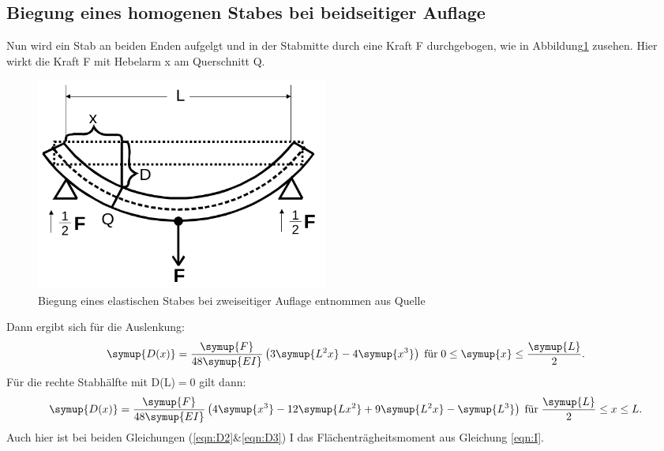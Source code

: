 \subsection{Biegung eines homogenen Stabes bei beidseitiger Auflage}
\label{sec:T2}
Nun wird ein Stab an beiden Enden aufgelgt und in der Stabmitte
durch eine Kraft F durchgebogen, wie in Abbildung\ref{fig:abb5} zusehen. Hier
wirkt die Kraft F mit Hebelarm x am Querschnitt Q.
\begin{figure}
  \centering
  \includegraphics[height= 7cm]{logos/Abb5.png}
  \caption{Biegung eines elastischen Stabes bei zweiseitiger Auflage
  entnommen aus Quelle \cite{sample} }
  \label{fig:abb5}
\end{figure}
\FloatBarrier
Dann ergibt sich für die Auslenkung:
\begin{equation}
  \symup{D(x)} = \frac{\symup{F}}{48 \symup{EI}}
  \left( 3\symup{L^2 x}-4\symup{x^3} \right) \; \text{für} \;
  0 \leq \symup{x} \leq \frac{\symup{L}}{2} .
  \label{eqn:D2}
\end{equation}
Für die rechte Stabhälfte mit D(L)$=$0 gilt dann:
\begin{equation}
  \symup{D(x)} = \frac{\symup{F}}{48 \symup{EI}}
  \left(4 \symup{x^3} - 12\symup{Lx^2} + 9\symup{L^2x} - \symup{L^3}\right)
  \; \text{für} \; \frac{\symup{L}}{2} \leq x \leq L .
  \label{eqn:D3}
\end{equation}
Auch hier ist bei beiden Gleichungen (\eqref{eqn:D2}\&\eqref{eqn:D3}) I das
Flächenträgheitsmoment aus Gleichung \eqref{eqn:I}.



























%

